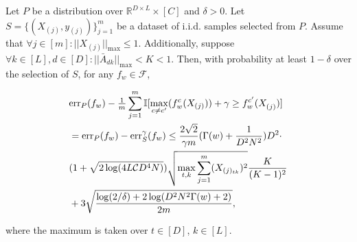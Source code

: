 \begin{theorem}\label{theorem:genproof}
Let $P$ be a distribution over $\mathbb{R}^{D \times L} \times [C]$ and $\delta > 0$. Let $S = \{( X^{}_{(j)},y_{(j)})\}^{m}_{j=1}$ be a dataset of i.i.d. samples selected from $P$. Assume that $\forall j \in [m]: ||X_{(j)}||_{\max} \leq 1$. Additionally, suppose $\forall k \in [L], d \in [D]:||\bar{A}^{}_{dk}||_{\max} < K < 1$. Then, with probability at least $1-\delta$ over the selection of $S$, for any $f_w \in \mathcal{F}$, 
\begin{small}
\begin{equation*}
\begin{aligned}
&\textnormal{err}_P(f_w) - {\textstyle\frac{1}{m}}\sum^{m}_{j=1}\mathbb{I}[\max_{c \neq c'}(f^c_w( X_{(j)})) + \gamma \geq f^{c'}_w( X^{}_{(j)})] \\& = \textnormal{err}_P(f_w) - \textnormal{err}^\gamma_S(f_w) \leq \frac{2\sqrt{2}}{\gamma m} ({\Gamma(w) } +{\frac{1}{D^2N^2}}) D^{2} \cdot \\& (1 + \sqrt{2\log (4L \mathcal{C} D^4 N)}) \sqrt{\max_{t, k} \sum_{j=1}^m (X_{(j)_{tk}})^2} \frac{K}{(K-1)^2} \\&+ 3\sqrt{\frac{\log(2/\delta)+2\log({D^2N^2\Gamma(w) }+2)}{2m}},
\end{aligned}
\end{equation*}
\end{small}
where the maximum is taken over \(t \in [D]\),  \(k \in [L]\). 

\end{theorem}

